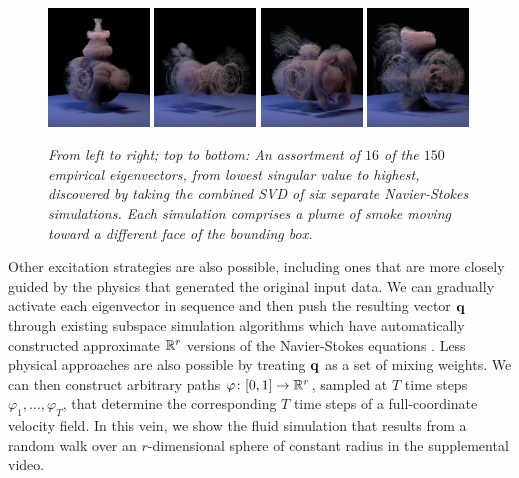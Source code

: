 \documentclass[11pt]{article}
\begin{document}
\begin{figure}
	\includegraphics[width=0.24\textwidth]{Figures/modes/plume0012.png}
	\includegraphics[width=0.24\textwidth]{Figures/modes/plume0013.png}
	\includegraphics[width=0.24\textwidth]{Figures/modes/plume0014.png}
	\includegraphics[width=0.24\textwidth]{Figures/modes/plume0015.png}
	\caption{\em From left to right; top to bottom: An assortment of $16$ of the $150$ empirical eigenvectors, from lowest singular value to highest,  discovered by taking the combined SVD of six separate Navier-Stokes simulations. Each simulation comprises a plume of smoke moving toward a different face of the bounding box.}
	\label{fig:eigs}
\end{figure}

Other excitation strategies are also possible, including ones that are more closely guided by the physics that generated the original input data. We can gradually activate each eigenvector in sequence and then push the resulting vector $\mathbf{q}$ through existing subspace simulation algorithms which have automatically constructed approximate $\mathbb{R}^r$ versions of the Navier-Stokes equations \cite{Kim2013}. Less physical approaches are also possible by treating $\mathbf{q}$ as a set of mixing weights. We can then construct arbitrary paths $\varphi \colon [0, 1] \rightarrow \mathbb{R}^r$, sampled at $T$ time steps $\varphi_1, \ldots, \varphi_T$, that determine the corresponding $T$ time steps of a full-coordinate velocity field. In this vein, we show the fluid simulation that results from a random walk over an $r$-dimensional sphere of constant radius in the supplemental video. 
\end{document}

